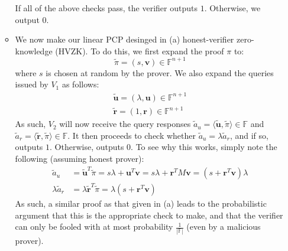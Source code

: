 \documentclass[12pt]{exam}
\begin{document}
\begin{questions}
\begin{solution}
\begin{enumerate}[label=\textbf{\alph*.}]
\begin{itemize}
      If all of the above checks pass, the verifier outputs $1$. Otherwise, we output $0$.


      \item We now make our linear PCP desinged in (a) honest-verifier zero-knowledge (HVZK). To do this, we first expand the proof $\pi$ to:
      \[
        \tilde{\pi} = (s, \textbf{v}) \in \mathbb{F}^{n+1}
      \] 
      where $s$ is chosen at random by the prover. We also expand the queries issued by $V_1$ as follows:
      \begin{align*}
        \tilde{\textbf{u}} = (\lambda, \textbf{u}) \in \mathbb{F}^{n+1} \\
        \tilde{\textbf{r}} = (1, \textbf{r}) \in \mathbb{F}^{n+1}
      \end{align*}
      As such, $V_2$ will now receive the query responses $\tilde{a}_u = \langle \tilde{\textbf{u}}, \tilde{\pi} \rangle \in \mathbb{F} $ and $\tilde{a}_r = \langle \tilde{\textbf{r}}, \tilde{\pi} \rangle  \in \mathbb{F}$. It then proceeds to check whether $\tilde{a}_u = \lambda \tilde{a}_r$, and if so, outputs $1$. Otherwise, outputs $0$. To see why this works, simply note the following (assuming honest prover):
      \begin{align*}
        \tilde{a}_u &= \tilde{\textbf{u}}^T\tilde{\pi} = s \lambda + \textbf{u}^T\textbf{v} = s\lambda + \textbf{r}^TM\textbf{v} = (s + \textbf{r}^T\textbf{v})\lambda \\
        \lambda \tilde{a}_r &= \lambda \tilde{\textbf{r}}^T \tilde{\pi} = \lambda(s + \textbf{r}^T\textbf{v})
      \end{align*}
      As such, a similar proof as that given in (a) leads to the probabilistic argument that this is the appropriate check to make, and that the verifier can only be fooled with at most probability $\frac{1}{|\mathbb{F}|}$ (even by a malicious prover).



\end{itemize}
\end{enumerate}
\end{solution}
\end{questions}
\end{document}
